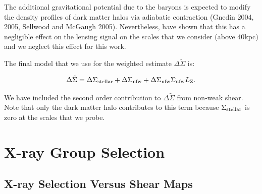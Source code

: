 \documentclass[12pt]{emulateapj}
\begin{document}
The additional gravitational potential due to the baryons is expected
to modify the density profiles of dark matter halos via adiabatic
contraction (Gnedin 2004, 2005, Sellwood and McGaugh
2005). Nevertheless, \citet{Mandelbaum:2006} have shown that this has
a negligible effect on the lensing signal on the scales that we
consider (above 40kpc) and we neglect this effect for this work.

The final model that we use for the weighted estimate $\Delta \tilde
\Sigma$ is:

\begin{equation}\label{ds_model}
\Delta \tilde \Sigma = \Delta\Sigma_{\rm stellar}+\Delta\Sigma_{\rm nfw}+\Delta\Sigma_{\rm nfw} \Sigma_{\rm nfw} L_{\rm Z}.
\end{equation}

We have included the second order contribution to $\Delta \tilde
\Sigma$ from non-weak shear. Note that only the dark matter halo
contributes to this term because $\Sigma_{\rm stellar}$ is zero at the
scales that we probe.


\section{X-ray Group Selection}\label{group_selection}

\subsection{X-ray Selection Versus Shear Maps}
\end{document}
